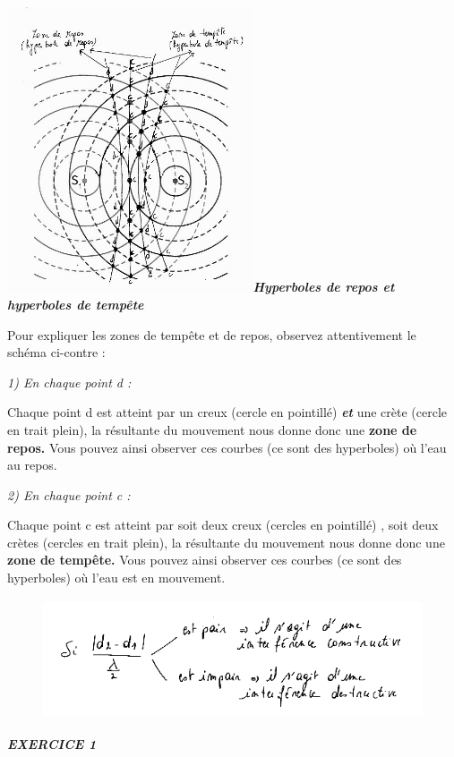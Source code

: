 \includegraphics[width=7.264cm,height=8.423cm]{Pictures/100000010000021B000002719784CD0CAF081F55.png}\emph{\textbf{Hyperboles
de repos et hyperboles de tempête}}

Pour expliquer les zones de tempête et de repos, observez attentivement
le schéma ci-contre :

\emph{1) En chaque point d :}

Chaque point d est atteint par un creux (cercle en pointillé)
\emph{\textbf{et}} une crète (cercle en trait plein), la résultante du
mouvement nous donne donc une \textbf{zone de repos.} Vous pouvez ainsi
observer ces courbes (ce sont des hyperboles) où l'eau au repos.

\emph{2) En chaque point c : }

Chaque point c est atteint par soit deux creux (cercles en pointillé) ,
soit deux crètes (cercles en trait plein), la résultante du mouvement
nous donne donc une \textbf{zone de tempête.} Vous pouvez ainsi observer
ces courbes (ce sont des hyperboles) où l'eau est en mouvement.

\begin{figure}
\centering
\includegraphics[width=13.005cm,height=3.542cm]{Pictures/1000000100000220000000A31734CD7DA5F285B4.png}
\caption{}
\end{figure}

\emph{\textbf{EXERCICE 1}}

